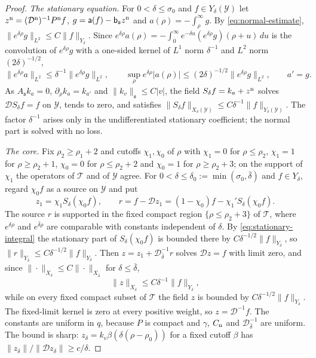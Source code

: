 \documentclass[11pt]{amsart}
\theoremstyle{definition}
\theoremstyle{remark}
\theoremstyle{plain}
\numberwithin{equation}{section}
\begin{document}
\begin{proof}
\emph{The stationary equation.} For $0<\delta\le\sigma_0$ and $f\in Y_\delta(\mathcal Y)$
let $z^{\rm n}=(\mathcal D^{\rm n})^{-1}P^{\rm n}f$, $g=\mathsf a(f)-\mathsf b_{\mathfrak s}
z^{\rm n}$ and $a(\rho)=-\int_\rho^\infty g$. By \eqref{eq:normal-estimate},
$\|e^{\delta\rho}g\|_{L^2}\le C\|f\|_{Y_\delta}$. Since
$e^{\delta\rho}a(\rho)=-\int_0^\infty e^{-\delta u}(e^{\delta\rho}g)(\rho+u)\,du$ is the
convolution of $e^{\delta\rho}g$ with a one-sided kernel of $L^1$ norm $\delta^{-1}$ and
$L^2$ norm $(2\delta)^{-1/2}$,
\begin{equation}\label{eq:stationary-integral}
\|e^{\delta\rho}a\|_{L^2}\le\delta^{-1}\|e^{\delta\rho}g\|_{L^2},\qquad
\sup_\rho e^{\delta\rho}|a(\rho)|\le(2\delta)^{-1/2}\|e^{\delta\rho}g\|_{L^2},\qquad a'=g .
\end{equation}
As $A_{\mathfrak s} k_a=0$, $\partial_\rho k_a=k_{a'}$ and $\|k_v\|_{\mathfrak s}\le C|v|$, the field
$S_\delta f=k_a+z^{\rm n}$ solves $\mathcal DS_\delta f=f$ on $\mathcal Y$, tends to zero,
and satisfies $\|S_\delta f\|_{X_\delta(\mathcal Y)}\le C\delta^{-1}\|f\|_{Y_\delta(\mathcal
Y)}$. The factor $\delta^{-1}$ arises only in the undifferentiated stationary
coefficient; the normal part is solved with no loss.

\emph{The core.} Fix $\rho_2\ge\rho_1+2$ and cutoffs $\chi_1,\chi_0$ of $\rho$ with
$\chi_1=0$ for $\rho\le\rho_2$, $\chi_1=1$ for $\rho\ge\rho_2+1$, $\chi_0=0$ for
$\rho\le\rho_2+2$ and $\chi_0=1$ for $\rho\ge\rho_2+3$; on the support of $\chi_1$ the
operators of $\mathcal T$ and of $\mathcal Y$ agree. For $0<\delta\le\delta_0:=\min(\sigma_0,
\bar\delta)$ and $f\in Y_\delta$, regard $\chi_0f$ as a source on $\mathcal Y$ and put
\[
z_1=\chi_1S_\delta(\chi_0f),\qquad r=f-\mathcal Dz_1=(1-\chi_0)f-\chi_1'S_\delta(\chi_0f).
\]
The source $r$ is supported in the fixed compact region $\{\rho\le\rho_2+3\}$ of
$\mathcal T$, where $e^{\delta\rho}$ and $e^{\bar\delta\rho}$ are comparable with constants
independent of $\delta$. By \eqref{eq:stationary-integral} the stationary part of
$S_\delta(\chi_0f)$ is bounded there by $C\delta^{-1/2}\|f\|_{Y_\delta}$, so
$\|r\|_{Y_{\bar\delta}}\le C\delta^{-1/2}\|f\|_{Y_\delta}$. Then $z=z_1+\mathcal
D^{-1}_{\bar\delta}r$ solves $\mathcal Dz=f$ with limit zero, and since $\|\cdot\|_{X_\delta}\le
C\|\cdot\|_{X_{\bar\delta}}$ for $\delta\le\bar\delta$,
\[
\|z\|_{X_\delta}\le C\delta^{-1}\|f\|_{Y_\delta},
\]
while on every fixed compact subset of $\mathcal T$ the field $z$ is bounded by
$C\delta^{-1/2}\|f\|_{Y_\delta}$. The fixed-limit kernel is zero at every positive weight,
so $z=\mathcal D^{-1}f$. The constants are uniform in $q$, because $P$ is compact and
$\gamma$, $C_{\rm n}$ and $\mathcal D^{-1}_{\bar\delta}$ are uniform. The bound is sharp:
$z_\delta=k_v\beta(\delta(\rho-\rho_0))$ for a fixed cutoff $\beta$ has
$\|z_\delta\|/\|\mathcal Dz_\delta\|\ge c/\delta$.

\end{proof}
\end{document}
